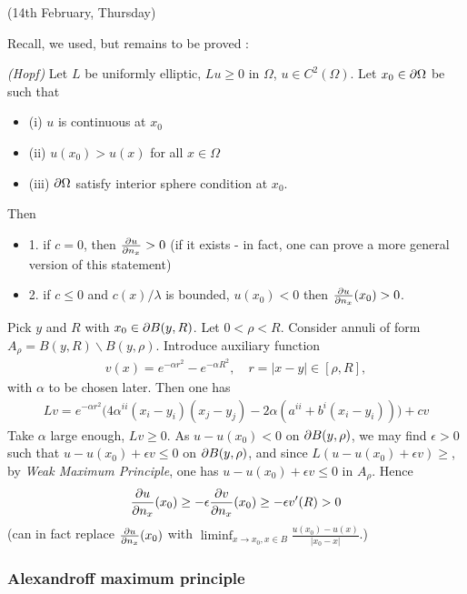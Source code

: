 \documentclass[12pt,a4paper]{article}
\newenvironment{proof}
{\begin{changemargin}{0.5cm}{0.5cm} 
	}%
	{\end{changemargin}
}
\renewenvironment{i}
{\begin{itemize} 
	}%
	{\end{itemize}
}
\newenvironment{p}
{\begin{proof} 
	}%
	{\end{proof}
}
\begin{document}
\newday

(14th February, Thursday)
\s

Recall, we used, but remains to be proved :

\lem \emph{(Hopf)} Let $L$ be uniformly elliptic, $Lu \geq 0$ in $\Omega$, $u\in C^2(\Omega)$. Let $x_0 \in \partial \Omega$ be such that
\begin{i}
\item[(i)] $u$ is continuous at $x_0$
\item[(ii)] $u(x_0) > u(x)$ for all $x\in \Omega$
\item[(iii)] $\partial \Omega$ satisfy interior sphere condition at $x_0$. 
\end{i}
Then
\begin{i}
\item[1.] if $c=0$, then $\frac{\partial u}{\partial n_x} >0$ (if it exists - in fact, one can prove a more general version of this statement)
\item[2.] if $c\leq 0$ and $c(x)/\lambda$ is bounded, $u(x_0)<0$ then $\frac{\partial u}{\partial n_x}(x_0)>0$.
\end{i}
\begin{p}
\pf Pick $y$ and $R$ with $x_0 \in \partial B(y, R)$. Let $0< \rho < R$. Consider annuli of form $A_{\rho} = B(y, R) \backslash B(y, \rho)$. Introduce auxiliary function
\begin{align*}
v(x) = e^{-\alpha r^2} - e^{-\alpha R^2}, \quad r=|x-y|\in [\rho, R],
\end{align*}
with $\alpha$ to be chosen later. Then one has
\begin{align*}
Lv = e^{-\alpha r^2} \Big( 4\alpha^{ii}(x_i -y_i)(x_j -y_j) - 2\alpha (a^{ii} + b^i (x_i - y_i)) \Big) + cv
\end{align*}
Take $\alpha$ large enough, $Lv \geq 0$. As $u - u(x_0) < 0$ on $\partial B(y, \rho)$, we may find $\epsilon >0$ such that $u - u(x_0) + \epsilon v \leq 0$ on $\partial B(y, \rho)$, and since $L(u-u(x_0)+ \epsilon v) \geq$, by \emph{Weak Maximum Principle}, one has $u - u(x_0) + \epsilon v\leq 0$ in $A_{\rho}$. Hence
\begin{align*}
\frac{\partial u}{\partial n_x}(x_0)\geq - \epsilon \frac{\partial v}{\partial n_x}(x_0) \geq - \epsilon v'(R) > 0
\end{align*}
(can in fact replace $\frac{\partial u}{\partial n_x}(x_0)$ with $\liminf_{x\rightarrow x_0, x\in B}\frac{u(x_0)- u(x)}{|x_0 - x|}$.)

\eop
\end{p}
\s

\subsubsection*{Alexandroff maximum principle}
\end{document}
